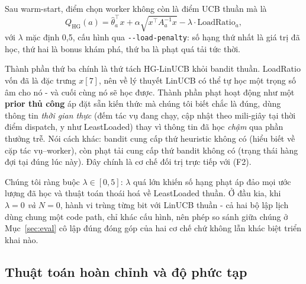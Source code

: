 \documentclass[final,5p,times,twocolumn]{elsarticle}
\begin{document}
Sau warm-start, điểm chọn worker không còn là điểm UCB thuần mà là
\begin{equation}
Q_{\text{HG}}(a)=\hat{\theta}_a^\top x+\alpha\sqrt{x^\top A_a^{-1}x}-\lambda\cdot\text{LoadRatio}_a,
\end{equation}
với $\lambda$ mặc định 0,5, cấu hình qua \texttt{-{}-load-penalty}: số hạng thứ nhất là giá trị đã học, thứ hai là bonus khám phá, thứ ba là phạt quá tải tức thời.

Thành phần thứ ba chính là thứ tách HG-LinUCB khỏi bandit thuần. LoadRatio vốn đã là đặc trưng $x[7]$, nên về lý thuyết LinUCB có thể tự học một trọng số âm cho nó - và cuối cùng nó sẽ học được. Thành phần phạt hoạt động như một \textbf{prior thủ công} áp đặt sẵn kiến thức mà chúng tôi biết chắc là đúng, dùng thông tin \emph{thời gian thực} (đếm tác vụ đang chạy, cập nhật theo mili-giây tại thời điểm dispatch, y như LeastLoaded) thay vì thông tin đã học \emph{chậm} qua phần thưởng trễ. Nói cách khác: bandit cung cấp thứ heuristic không có (hiểu biết về cặp tác vụ--worker), còn phạt tải cung cấp thứ bandit không có (trạng thái hàng đợi tại đúng lúc này). Đây chính là cơ chế đối trị trực tiếp với (F2).

Chúng tôi ràng buộc $\lambda\in[0,5]$: $\lambda$ quá lớn khiến số hạng phạt áp đảo mọi ước lượng đã học và thuật toán thoái hoá về LeastLoaded thuần. Ở đầu kia, khi $\lambda=0$ \emph{và} $N=0$, hành vi trùng từng bit với LinUCB thuần - cả hai bộ lập lịch dùng chung một code path, chỉ khác cấu hình, nên phép so sánh giữa chúng ở Mục~\ref{sec:eval} cô lập đúng đóng góp của hai cơ chế chứ không lẫn khác biệt triển khai nào.

\subsection{Thuật toán hoàn chỉnh và độ phức tạp}
\label{sec:algo}
\end{document}

